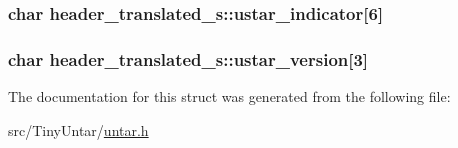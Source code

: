 \subsubsection[{\texorpdfstring{ustar\+\_\+indicator}{ustar_indicator}}]{\setlength{\rightskip}{0pt plus 5cm}char header\+\_\+translated\+\_\+s\+::ustar\+\_\+indicator\mbox{[}6\mbox{]}}\hypertarget{structheader__translated__s_a9b6bda43cd091bce7cc5cffa9dfbc038}{}\label{structheader__translated__s_a9b6bda43cd091bce7cc5cffa9dfbc038}
\subsubsection[{\texorpdfstring{ustar\+\_\+version}{ustar_version}}]{\setlength{\rightskip}{0pt plus 5cm}char header\+\_\+translated\+\_\+s\+::ustar\+\_\+version\mbox{[}3\mbox{]}}\hypertarget{structheader__translated__s_a6cebb43238e53d4707db8b9c58e72416}{}\label{structheader__translated__s_a6cebb43238e53d4707db8b9c58e72416}


The documentation for this struct was generated from the following file\+:\begin{DoxyCompactItemize}
\item 
src/\+Tiny\+Untar/\hyperlink{untar_8h}{untar.\+h}\end{DoxyCompactItemize}
